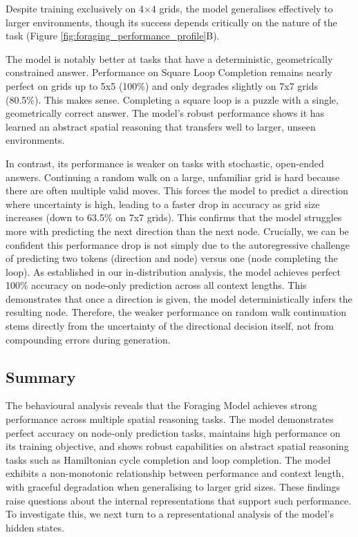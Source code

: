 Despite training exclusively on 4×4 grids, the model generalises effectively to larger environments, though its success depends critically on the nature of the task (Figure \ref{fig:foraging_performance_profile}B). 

The model is notably better at tasks that have a deterministic, geometrically constrained answer. Performance on Square Loop Completion remains nearly perfect on grids up to 5x5 (100\%) and only degrades slightly on 7x7 grids (80.5\%). This makes sense. Completing a square loop is a puzzle with a single, geometrically correct answer. The model's robust performance shows it has learned an abstract spatial reasoning that transfers well to larger, unseen environments.

In contrast, its performance is weaker on tasks with stochastic, open-ended answers. Continuing a random walk on a large, unfamiliar grid is hard because there are often multiple valid moves. This forces the model to predict a direction where uncertainty is high, leading to a faster drop in accuracy as grid size increases (down to 63.5\% on 7x7 grids). This confirms that the model struggles more with predicting the next direction than the next node. Crucially, we can be confident this performance drop is not simply due to the autoregressive challenge of predicting two tokens (direction and node) versus one (node completing the loop). As established in our in-distribution analysis, the model achieves perfect 100\% accuracy on node-only prediction across all context lengths. This demonstrates that once a direction is given, the model deterministically infers the resulting node. Therefore, the weaker performance on random walk continuation stems directly from the uncertainty of the directional decision itself, not from compounding errors during generation.

\subsection{Summary}

The behavioural analysis reveals that the Foraging Model achieves strong performance across multiple spatial reasoning tasks. The model demonstrates perfect accuracy on node-only prediction tasks, maintains high performance on its training objective, and shows robust capabilities on abstract spatial reasoning tasks such as Hamiltonian cycle completion and loop completion. The model exhibits a non-monotonic relationship between performance and context length, with graceful degradation when generalising to larger grid sizes. These findings raise questions about the internal representations that support such performance. To investigate this, we next turn to a representational analysis of the model's hidden states.

